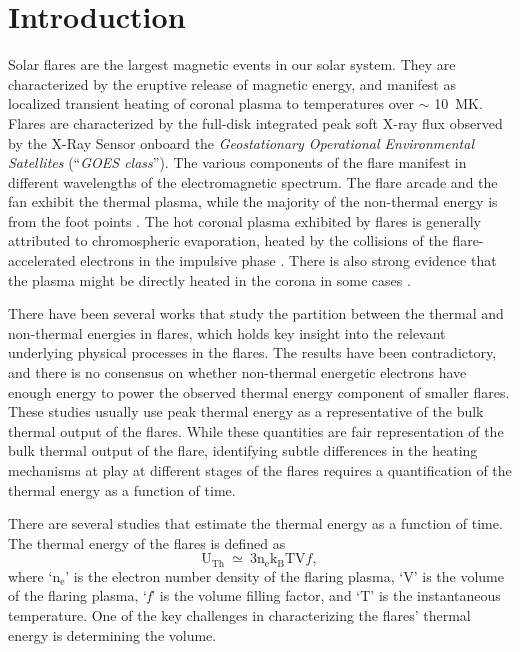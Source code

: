 \justifying

\section{Introduction} \label{sec:intro}

Solar flares are the largest magnetic events in our solar system. They are characterized by the eruptive release of magnetic energy, and manifest as localized transient heating of coronal plasma to temperatures over $\sim$ 10~MK. Flares are characterized by the full-disk integrated peak soft X-ray flux observed by the X-Ray Sensor onboard the {\it Geostationary Operational Environmental Satellites} \citep[{\it GOES}/XRS,][]{xrs} (``\textit{GOES class}''). The various components of the flare manifest in different wavelengths of the electromagnetic spectrum. The flare arcade and the fan exhibit the thermal plasma, while the majority of the non-thermal energy is from the foot points \citep{benz17}. The hot coronal plasma exhibited by flares is generally attributed to chromospheric evaporation, heated by the collisions of the flare-accelerated electrons in the impulsive phase \citep{fletcher11}. There is also strong evidence that the plasma might be directly heated in the corona in some cases \citep[e.g.][]{longcope11, reeves17}. 

There have been several works \citep{stosire07,emslie12,inglis14,warmuth16a,warmuth16b,ash17} that study the partition between the thermal and non-thermal energies in flares, which holds key insight into the relevant underlying physical processes in the flares. The results have been contradictory, and there is no consensus on whether non-thermal energetic electrons have enough energy to power the observed thermal energy component of smaller flares. These studies usually use peak thermal energy as a representative of the bulk thermal output of the flares. While these quantities are fair representation of the bulk thermal output of the flare, identifying subtle differences in the heating mechanisms at play at different stages of the flares requires a quantification of the thermal energy as a function of time.

There are several studies \citep{hilarie05,caspi10} that estimate the thermal energy as a function of time. The thermal energy of the flares is defined as 
\begin{equation}
\mathrm{U_{Th}~\simeq~3n_{e}k_{B}TV}f,
\end{equation} \label{eq:t_eneg_1}
 where `$\mathrm{n_{e}}$' is the electron number density of the flaring plasma, `V' is the volume of the flaring plasma, `\textit{f}' is the volume filling factor, and `T' is the instantaneous temperature. One of the key challenges in characterizing the flares' thermal energy is determining the volume. 

